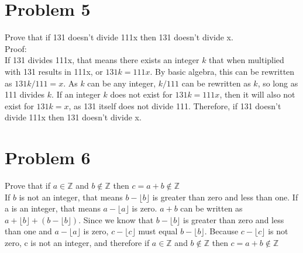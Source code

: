 \documentclass{article}
\newcommand{\floor}[1]{\lfloor #1 \rfloor}
\begin{document}
\section*{Problem 5}
Prove that if 131 doesn't divide 111x then 131 doesn't divide x.\\
Proof:\\
If 131 divides 111x, that means there exists an integer $k$ that when multiplied with 131 results in 111x, or $131k=111x$. By basic algebra, this can be rewritten as $131k/111=x$. As $k$ can be any integer, $k/111$ can be rewritten as $k$, so long as 111 divides $k$. If an integer $k$ does not exist for $131k=111x$, then it will also not exist for $131k=x$, as 131 itself does not divide 111. Therefore, if 131 doesn't divide 111x then 131 doesn't divide x.
\section*{Problem 6}
Prove that if $a\in \mathbb{Z}$ and $b \notin \mathbb{Z}$ then $c=a+b\notin \mathbb{Z}$\\
If $b$ is not an integer, that means $b-\floor{b}$ is greater than zero and less than one. If a is an integer, that means  $a-\floor{a}$ is zero. $a+b$ can be written as $a+\floor{b}+(b-\floor{b})$. Since we know that $b-\floor{b}$ is greater than zero and less than one and $a-\floor{a}$ is zero, $c-\floor{c}$ must equal $b-\floor{b}$. Because $c-\floor{c}$ is not zero, c is not an integer, and therefore if $a\in \mathbb{Z}$ and $b \notin \mathbb{Z}$ then $c=a+b\notin \mathbb{Z}$
\end{document}
